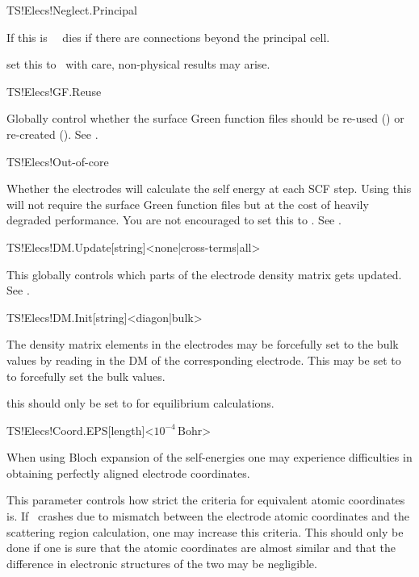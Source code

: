 \begin{fdflogicalF}{TS!Elecs!Neglect.Principal}
  
  If this is \fdffalse\ \tsiesta\ dies if there are connections beyond
  the principal cell.

  \note set this to \fdftrue\ with care, non-physical results may
  arise. 

\end{fdflogicalF}  

\begin{fdflogicalT}{TS!Elecs!GF.Reuse}
  
  Globally control whether the surface Green function files should
  be re-used (\fdftrue) or re-created (\fdffalse).
  See .
  
\end{fdflogicalT}

\begin{fdflogicalT}{TS!Elecs!Out-of-core}

  Whether the electrodes will calculate the self energy at each SCF
  step. Using this will not require the surface Green function files
  but at the cost of heavily degraded performance.
  You are not encouraged to set this to \fdffalse.
  See .
  
\end{fdflogicalT}

\begin{fdfentry}{TS!Elecs!DM.Update}[string]<none|cross-terms|all>

  This globally controls which parts of the electrode density matrix
  gets updated. 
  See .
  
\end{fdfentry}

\begin{fdfentry}{TS!Elecs!DM.Init}[string]<diagon|bulk>

  The density matrix elements in the electrodes may be forcefully set
  to the bulk values by reading in the DM of the corresponding
  electrode. This may be set to  to forcefully set the bulk
  values.

  \note this should only be set to  for equilibrium
  calculations. 
  
\end{fdfentry}

\begin{fdfentry}{TS!Elecs!Coord.EPS}[length]<$10^{-4}\,\mathrm{Bohr}$>

  When using Bloch expansion of the self-energies one may experience
  difficulties in obtaining perfectly aligned electrode coordinates.

  This parameter controls how strict the criteria for equivalent
  atomic coordinates is. If \tsiesta\ crashes due to mismatch between
  the electrode atomic coordinates and the scattering region
  calculation, one may increase this criteria. This should only be
  done if one is sure that the atomic coordinates are almost similar
  and that the difference in electronic structures of the two may be
  negligible.
  
\end{fdfentry}


